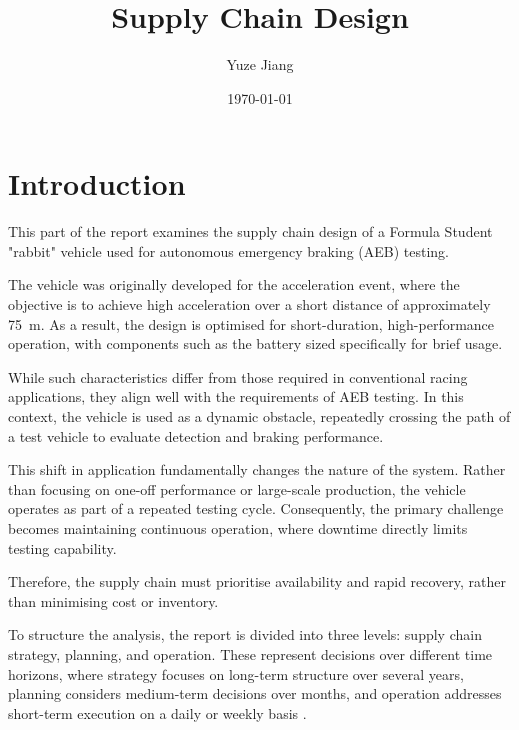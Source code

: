 \documentclass[11pt, a4paper]{report}
\title{Supply Chain Design}
\author{Yuze Jiang}
\date{\today}
\numberwithin{equation}{section}
\begin{document}

\maketitle

\newpage

\setcounter{page}{1}

\tableofcontents
\newpage


\section{Introduction}

This part of the report examines the supply chain design of a Formula Student "rabbit" vehicle used for autonomous emergency braking (AEB) testing.

The vehicle was originally developed for the acceleration event, where the objective is to achieve high acceleration over a short distance of approximately \SI{75}{\meter}. As a result, the design is optimised for short-duration, high-performance operation, with components such as the battery sized specifically for brief usage.

While such characteristics differ from those required in conventional racing applications, they align well with the requirements of AEB testing. In this context, the vehicle is used as a dynamic obstacle, repeatedly crossing the path of a test vehicle to evaluate detection and braking performance.

This shift in application fundamentally changes the nature of the system. Rather than focusing on one-off performance or large-scale production, the vehicle operates as part of a repeated testing cycle. Consequently, the primary challenge becomes maintaining continuous operation, where downtime directly limits testing capability.


Therefore, the supply chain must prioritise availability and rapid recovery, rather than minimising cost or inventory.

To structure the analysis, the report is divided into three levels: supply chain strategy, planning, and operation. These represent decisions over different time horizons, where strategy focuses on long-term structure over several years, planning considers medium-term decisions over months, and operation addresses short-term execution on a daily or weekly basis \cite{Supply_chain_lecture}.
\end{document}

